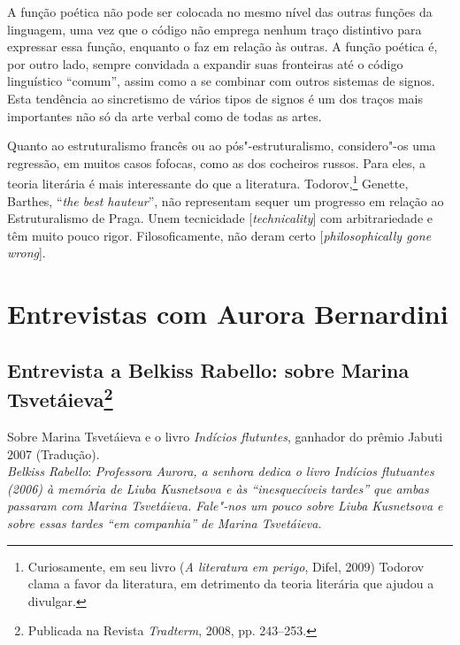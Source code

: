 A função poética não pode ser colocada no mesmo nível das outras funções
da linguagem, uma vez que o código não emprega nenhum traço distintivo
para expressar essa função, enquanto o faz em relação às outras. A
função poética é, por outro lado, sempre convidada a expandir suas
fronteiras até o código linguístico ``comum'', assim como a se combinar
com outros sistemas de signos.
Esta tendência ao sincretismo de vários tipos de signos é um
dos traços mais importantes não só da arte verbal como de todas as artes.

Quanto ao estruturalismo francês ou ao pós"-estruturalismo, considero"-os
uma regressão, em muitos casos fofocas, como as dos cocheiros russos.
Para eles, a teoria literária é mais interessante do que a literatura.
Todorov,\footnote{Curiosamente, em seu livro (\emph{A literatura
em perigo}, Difel, 2009) Todorov clama a favor da literatura, em detrimento da
teoria literária que ajudou a divulgar.} Genette, Barthes, ``\emph{the best hauteur}'', não representam
sequer um progresso em relação ao Estruturalismo de Praga. Unem
tecnicidade [\emph{technicality}] com arbitrariedade e têm muito pouco
rigor. Filosoficamente, não deram certo [\emph{philosophically gone
wrong}].

\part{Entrevistas com Aurora Bernardini}

\chapter{Entrevista a Belkiss Rabello: sobre Marina Tsvetáieva\footnote{Publicada na Revista
  \emph{Tradterm}, 2008, pp. 243--253.}}

Sobre Marina Tsvetáieva e o livro \emph{Indícios flutuntes}, ganhador do
prêmio Jabuti 2007 (Tradução). \\

\noindent
\emph{Belkiss Rabello}: \emph{Professora Aurora, a senhora dedica o
livro \emph{Indícios flutuantes} (2006) à memória de Liuba Kusnetsova e
às ``inesquecíveis tardes'' que ambas passaram com Marina Tsvetáieva.
Fale"-nos um pouco sobre Liuba Kusnetsova e sobre essas tardes ``em
companhia'' de Marina Tsvetáieva.}


